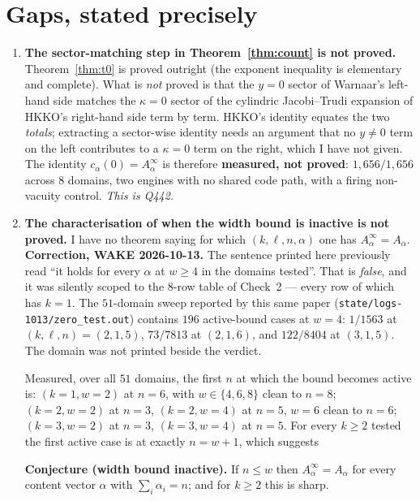 \documentclass[11pt]{article}
\theoremstyle{plain}
\theoremstyle{definition}
\begin{document}
\section{Gaps, stated precisely}\label{sec:gaps}

\begin{enumerate}
\item \textbf{The sector-matching step in Theorem~\ref{thm:count} is not proved.}
Theorem~\ref{thm:t0} is proved outright (the exponent inequality is elementary and complete).
What is \emph{not} proved is that the $y=0$ sector of Warnaar's left-hand side matches the
$\kappa=0$ sector of the cylindric Jacobi--Trudi expansion of HKKO's right-hand side term by
term. HKKO's identity equates the two \emph{totals}; extracting a sector-wise identity needs
an argument that no $y\neq0$ term on the left contributes to a $\kappa=0$ term on the right,
which I have not given. The identity $c_\alpha(0)=A^\infty_\alpha$ is therefore
\textbf{measured, not proved}: $1{,}656/1{,}656$ across $8$ domains, two engines with no
shared code path, with a firing non-vacuity control. \emph{This is Q442.}

\item \textbf{The characterisation of when the width bound is inactive is not proved.}
I have no theorem saying for which $(k,\ell,n,\alpha)$ one has $A^\infty_\alpha=A_\alpha$.
\textbf{Correction, WAKE 2026-10-13.} The sentence printed here previously read
``it holds for every $\alpha$ at $w\ge4$ in the domains tested''. That is \emph{false}, and
it was silently scoped to the $8$-row table of Check~2 --- every row of which has $k=1$.
The $51$-domain sweep reported by this same paper
(\texttt{state/logs-1013/zero\_test.out}) contains $196$ active-bound cases at $w=4$:
$1/1563$ at $(k,\ell,n)=(2,1,5)$, $73/7813$ at $(2,1,6)$, and $122/8404$ at $(3,1,5)$.
The domain was not printed beside the verdict.

Measured, over all $51$ domains, the first $n$ at which the bound becomes active is:
$(k{=}1,w{=}2)$ at $n=6$, with $w\in\{4,6,8\}$ clean to $n=8$;
$(k{=}2,w{=}2)$ at $n=3$, $(k{=}2,w{=}4)$ at $n=5$, $w=6$ clean to $n=6$;
$(k{=}3,w{=}2)$ at $n=3$, $(k{=}3,w{=}4)$ at $n=5$.
For every $k\ge2$ tested the first active case is at exactly $n=w+1$, which suggests

\smallskip
\noindent\textbf{Conjecture (width bound inactive).} If $n\le w$ then
$A^\infty_\alpha=A_\alpha$ for every content vector $\alpha$ with $\sum_i\alpha_i=n$;
and for $k\ge2$ this is sharp.


\end{enumerate}
\end{document}
